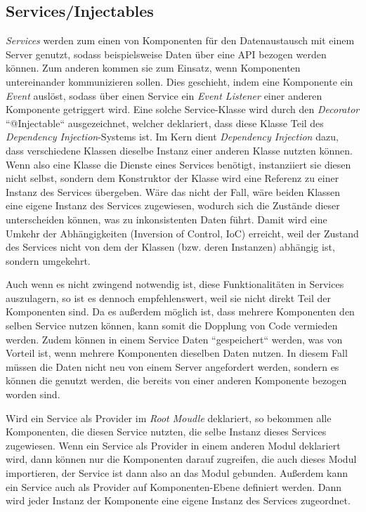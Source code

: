 \subsection{Services/Injectables}
\label{sec:technologies:angular:service}
\textit{Services} werden zum einen von Komponenten für den Datenaustausch mit einem Server genutzt, sodass beispielsweise Daten über eine API bezogen werden können. Zum anderen kommen sie zum Einsatz, wenn Komponenten untereinander kommunizieren sollen. Dies geschieht, indem eine Komponente ein \textit{Event} auslöst, sodass über einen Service ein \textit{Event Listener} einer anderen Komponente getriggert wird. Eine solche Service-Klasse wird durch den \textit{Decorator} ``@Injectable`` ausgezeichnet, welcher deklariert, dass diese Klasse Teil des \textit{Dependency Injection}-Systems ist\cite{AngularService}. Im Kern dient \textit{Dependency Injection} dazu, dass verschiedene Klassen dieselbe Instanz einer anderen Klasse nutzten können. Wenn also eine Klasse die Dienste eines Services benötigt, instanziiert sie diesen nicht selbst, sondern dem Konstruktor der Klasse wird eine Referenz zu einer Instanz des Services übergeben.
Wäre das nicht der Fall, wäre beiden Klassen eine eigene Instanz des Services zugewiesen, wodurch sich die Zustände dieser unterscheiden können, was zu inkonsistenten Daten führt. Damit wird eine Umkehr der Abhängigkeiten (Inversion of Control, IoC) erreicht, weil der Zustand des Services nicht von dem der Klassen (bzw. deren Instanzen) abhängig ist, sondern umgekehrt\cite{IoC}.

Auch wenn es nicht zwingend notwendig ist, diese Funktionalitäten in Services auszulagern, so ist es dennoch empfehlenswert, weil sie nicht direkt Teil der Komponenten sind. Da es außerdem möglich ist, dass mehrere Komponenten den selben Service nutzen können, kann somit die Dopplung von Code vermieden werden. Zudem können in einem Service Daten ``gespeichert`` werden, was von Vorteil ist, wenn mehrere Komponenten dieselben Daten nutzen.  In diesem Fall müssen die Daten nicht neu von einem Server angefordert werden, sondern es können die genutzt werden, die bereits von einer anderen Komponente bezogen worden sind.

Wird ein Service als Provider im \textit{Root Moudle} deklariert, so bekommen alle Komponenten, die diesen Service nutzten, die selbe Instanz dieses Services zugewiesen. Wenn ein Service als Provider in einem anderen Modul deklariert wird, dann können nur die Komponenten darauf zugreifen, die auch dieses Modul importieren, der Service ist dann also an das Modul gebunden. Außerdem kann ein Service auch als Provider auf Komponenten-Ebene definiert werden. Dann wird jeder Instanz der Komponente eine eigene Instanz des Services zugeordnet.

